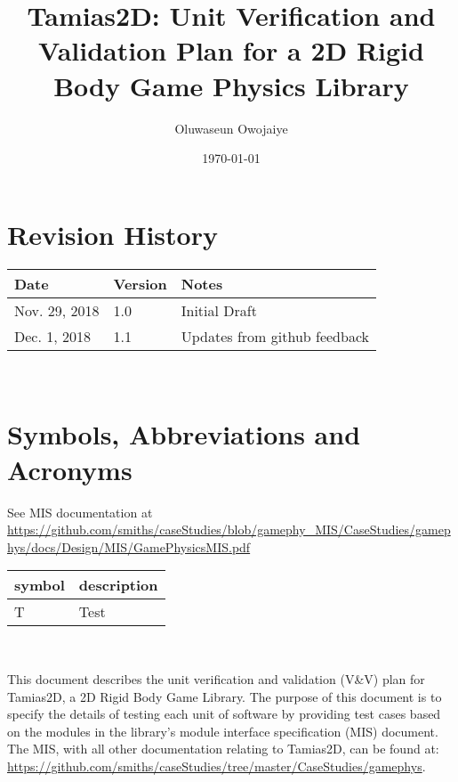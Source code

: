 \documentclass[12pt, titlepage]{article}
\newcommand{\progname}{Tamias2D}
\begin{document}
\title{Tamias2D: Unit Verification and Validation Plan for a 2D Rigid Body Game Physics Library} 
\author{Oluwaseun Owojaiye}
\date{\today}
	
\maketitle


\section{Revision History}

\begin{tabularx}{\textwidth}{p{3cm}p{2cm}X}
\toprule {\bf Date} & {\bf Version} & {\bf Notes}\\
\midrule
Nov. 29, 2018 & 1.0 & Initial Draft\\
Dec. 1, 2018 & 1.1 & Updates from github feedback\\
\bottomrule
\end{tabularx}

~\newpage

\section{Symbols, Abbreviations and Acronyms}
See MIS documentation at \url{https://github.com/smiths/caseStudies/blob/gamephy_MIS/CaseStudies/gamephys/docs/Design/MIS/GamePhysicsMIS.pdf} \\
\renewcommand{\arraystretch}{1.2}
\begin{tabular}{l l} 
  \toprule		
  \textbf{symbol} & \textbf{description}\\
  \midrule 
  T & Test\\
  \bottomrule
\end{tabular}\\


\newpage

\tableofcontents

\listoftables

\listoffigures

\newpage


This document describes the unit verification and validation (V\&V) plan for \progname, a 2D Rigid Body Game Library. The purpose of this document is to specify the details of testing each unit of software by providing test cases based on the modules in the library's module interface specification (MIS) document. The MIS, with all other documentation relating to \progname{}, can be found at: \url{https://github.com/smiths/caseStudies/tree/master/CaseStudies/gamephys}.
\end{document}

